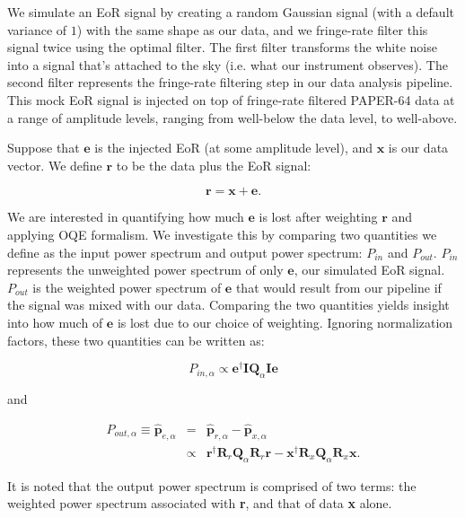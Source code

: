 \documentclass[preprint2,numberedappendix,tighten]{aastex6}  %
\begin{document}
We simulate an EoR signal by creating a random Gaussian signal (with a default variance of $1$) with the same shape as our data, and we fringe-rate filter this signal twice using the optimal filter. The first filter transforms the white noise into a signal that's attached to the sky (i.e. what our instrument observes). The second filter represents the fringe-rate filtering step in our data analysis pipeline. This mock EoR signal is injected on top of fringe-rate filtered PAPER-64 data at a range of amplitude levels, ranging from well-below the data level, to well-above.

Suppose that $\textbf{e}$ is the injected EoR (at some amplitude level), and $\textbf{x}$ is our data vector. We define $\textbf{r}$ to be the data plus the EoR signal:

\begin{equation}
\textbf{r} = \textbf{x} + \textbf{e}.
\end{equation}

We are interested in quantifying how much $\textbf{e}$ is lost after weighting $\textbf{r}$ and applying OQE formalism. We investigate this by comparing two quantities we define as the input power spectrum and output power spectrum: $P_{in}$ and $P_{out}$. $P_{in}$ represents the unweighted power spectrum of only $\textbf{e}$, our simulated EoR signal. $P_{out}$ is the weighted power spectrum of $\textbf{e}$ that would result from our pipeline if the signal was mixed with our data. Comparing the two quantities yields insight into how much of $\textbf{e}$ is lost due to our choice of weighting. Ignoring normalization factors, these two quantities can be written as:

\begin{equation}
P_{in,\alpha} \propto \textbf{e}^{\dagger}\textbf{I}\textbf{Q}_{\alpha}\textbf{I}\textbf{e}
\end{equation}

\noindent and

\begin{eqnarray}
\label{eq:sigloss}
P_{out,\alpha} \equiv \hat{\textbf{p}}_{e,\alpha} &=& \hat{\textbf{p}}_{r,\alpha}-\hat{\textbf{p}}_{x,\alpha} \nonumber \\
&\propto& \textbf{r}^{\dagger}\textbf{R}_{r}\textbf{Q}_{\alpha}\textbf{R}_{r}\textbf{r} - \textbf{x}^{\dagger}\textbf{R}_{x}\textbf{Q}_{\alpha}\textbf{R}_{x}\textbf{x}.
\end{eqnarray}

It is noted that the output power spectrum is comprised of two terms: the weighted power spectrum associated with \textbf{r}, and that of data \textbf{x} alone. 
\end{document}
